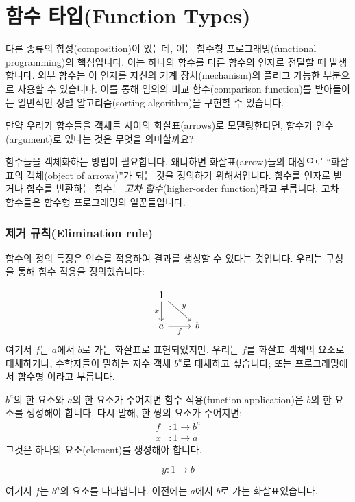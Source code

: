 \documentclass[DaoFP]{subfiles}
\begin{document}
\setcounter{chapter}{5}

\chapter{함수 타입(Function Types)}

다른 종류의 합성(composition)이 있는데, 이는 함수형 프로그래밍(functional programming)의 핵심입니다. 이는 하나의 함수를 다른 함수의 인자로 전달할 때 발생합니다. 외부 함수는 이 인자를 자신의 기계 장치(mechanism)의 플러그 가능한 부분으로 사용할 수 있습니다. 이를 통해 임의의 비교 함수(comparison function)를 받아들이는 일반적인 정렬 알고리즘(sorting algorithm)을 구현할 수 있습니다.

만약 우리가 함수들을 객체들 사이의 화살표(arrows)로 모델링한다면, 함수가 인수(argument)로 있다는 것은 무엇을 의미할까요?

함수들을 객체화하는 방법이 필요합니다. 왜냐하면 화살표(arrow)들의 대상으로 ``화살표의 객체(object of arrows)''가 되는 것을 정의하기 위해서입니다. 함수를 인자로 받거나 함수를 반환하는 함수는 \emph{고차 함수}(higher-order function)라고 부릅니다. 고차 함수들은 함수형 프로그래밍의 일꾼들입니다.

\subsection{제거 규칙(Elimination rule)}

함수의 정의 특징은 인수를 적용하여 결과를 생성할 수 있다는 것입니다. 우리는 구성을 통해 함수 적용을 정의했습니다:

\[
 \begin{tikzcd}
 1
 \arrow[d, "x"']
 \arrow[rd, "y"]
 \\
 a
 \arrow[r, "f"']
& b
 \end{tikzcd}
\]
여기서 $f$는 $a$에서 $b$로 가는 화살표로 표현되었지만, 우리는 $f$를 화살표 객체의 요소로 대체하거나, 수학자들이 말하는 지수 객체 $b^a$로 대체하고 싶습니다; 또는 프로그래밍에서 함수형 이라고 부릅니다.

$b^a$의 한 요소와 $a$의 한 요소가 주어지면 함수 적용(function application)은 $b$의 한 요소를 생성해야 합니다. 다시 말해, 한 쌍의 요소가 주어지면:
\begin{align*}
f &\colon 1 \to b^a \\
x &\colon 1 \to a
\end{align*}
그것은 하나의 요소(element)를 생성해야 합니다.

\[y \colon 1 \to b \]

여기서 $f$는 $b^a$의 요소를 나타냅니다. 이전에는 $a$에서 $b$로 가는 화살표였습니다.
\end{document}
